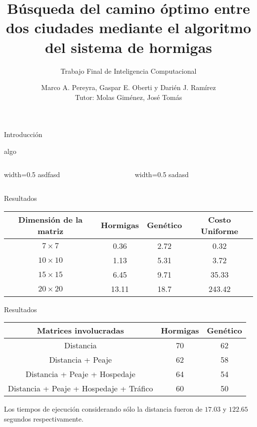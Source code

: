 \documentclass{beamer}
\begin{document}
\title{Búsqueda del camino óptimo entre dos ciudades mediante el algoritmo del sistema de hormigas}
\subtitle{Trabajo Final de Inteligencia Computacional}
\author{Marco A. Pereyra,
        Gaspar E. Oberti y 
        Darién J. Ramírez \\ Tutor: Molas Giménez, José Tomás}
\date{\empty}

\frame{\titlepage}

\begin{frame}{Introducción} %

\end{frame}
\begin{frame}[fragile]{algo}
\begin{columns}
\begin{column}{width=0.5\textwidth}
asdfasd
\end{column}
\begin{column}{width=0.5\textwidth}
    sadasd
\end{column}
\end{columns}
\end{frame}
\begin{frame}{Resultados}
\begin{tabular}[c]{cccc} \toprule
Dimensión de la matriz & Hormigas & Genético & Costo Uniforme \\ \midrule
$7\times7$    & 0.36  & 2.72 & 0.32     \\
$10\times10$  & 1.13  & 5.31 & 3.72     \\
$15\times15$  & 6.45  & 9.71 & 35.33    \\
$20\times20$  & 13.11 & 18.7 & 243.42   \\ \bottomrule    
\end{tabular}
\end{frame}
\begin{frame}{Resultados}
\begin{tabular}[c]{ccc} \toprule
Matrices involucradas & Hormigas & Genético\\ \midrule
Distancia       						& 70 & 62 \\
Distancia + Peaje     					& 62 & 58 \\
Distancia + Peaje + Hospedaje   		& 64 & 54 \\
Distancia + Peaje + Hospedaje + Tráfico & 60 & 50 \\ \bottomrule    
\end{tabular}
\vfill
Los tiempos de ejecución considerando sólo la distancia fueron de $17.03$ y $122.65$ segundos respectivamente.
\end{frame}
\end{document}
